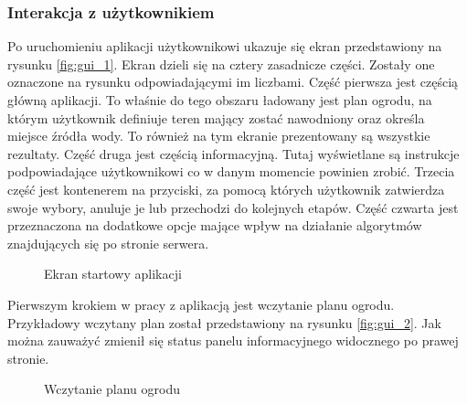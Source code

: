 \documentclass[twoside]{iisthesis}
\begin{document}
\subsubsection{Interakcja z użytkownikiem}
Po uruchomieniu aplikacji użytkownikowi ukazuje się ekran przedstawiony na rysunku \eqref{fig:gui_1}. Ekran dzieli się na cztery zasadnicze części. Zostały one oznaczone na rysunku odpowiadającymi im liczbami. Część pierwsza jest częścią główną aplikacji. To właśnie do tego obszaru ładowany jest plan ogrodu, na którym użytkownik definiuje teren mający zostać nawodniony oraz określa miejsce źródła wody. To również na tym ekranie prezentowany są wszystkie rezultaty. Część druga jest częścią informacyjną. Tutaj wyświetlane są instrukcje podpowiadające użytkownikowi co w danym momencie powinien zrobić. Trzecia część jest kontenerem na przyciski, za pomocą których użytkownik zatwierdza swoje wybory, anuluje je lub przechodzi do kolejnych etapów. Część czwarta jest przeznaczona na dodatkowe opcje mające wpływ na działanie algorytmów znajdujących się po stronie serwera.
\begin{figure}[!htb]
	\centering
	\caption{Ekran startowy aplikacji}
	\label{fig:gui_1}
\end{figure}

Pierwszym krokiem w pracy z aplikacją jest wczytanie planu ogrodu. Przykładowy wczytany plan został przedstawiony na rysunku \eqref{fig:gui_2}. Jak można zauważyć zmienił się status panelu informacyjnego widocznego po prawej stronie.
\begin{figure}[!htb]
	\centering
	\caption{Wczytanie planu ogrodu}
	\label{fig:gui_2}
\end{figure}
\end{document}
